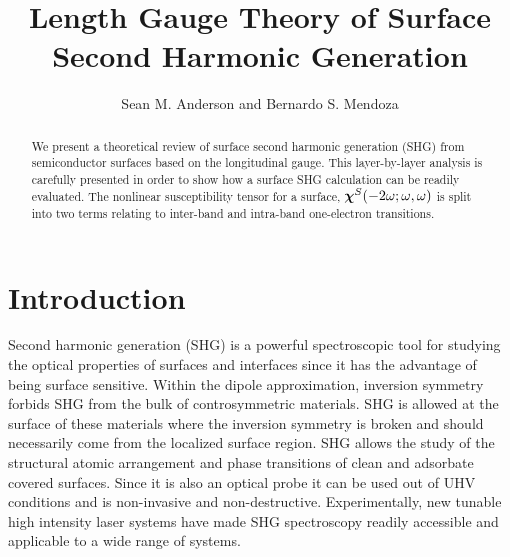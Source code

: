 \documentclass[floatfix,prb,aps,superscriptaddress,11pt,preprint,letterpaper]{revtex4}
\begin{document}
\title{Length Gauge Theory of Surface Second Harmonic Generation}
\author{Sean M. Anderson and Bernardo S. Mendoza}

\begin{abstract}
We present a theoretical review of surface second harmonic generation (SHG) 
from semiconductor surfaces based on the longitudinal gauge. This 
layer-by-layer analysis is carefully presented in order to show how a 
surface SHG calculation can be readily evaluated. The nonlinear susceptibility 
tensor for a surface, $\boldsymbol{\chi}^S(-2\omega;\omega,\omega)$
 is split into two terms relating to inter-band 
and intra-band one-electron transitions. 


\end{abstract}  

\maketitle
\tableofcontents

\section{Introduction}\label{intro}

Second harmonic generation (SHG) is a powerful spectroscopic tool for 
studying the optical properties of surfaces and interfaces since it has 
the advantage of being surface sensitive. Within the dipole approximation, 
inversion symmetry forbids SHG from the bulk of controsymmetric materials. 
SHG is allowed at the surface of these materials where the inversion symmetry 
is broken and should necessarily come from the localized surface region. 
SHG allows the study of the structural atomic arrangement and phase 
transitions of clean and adsorbate covered surfaces. Since it is also an 
optical probe it can be used out of UHV conditions and is non-invasive 
and non-destructive. Experimentally, new tunable high intensity laser systems 
have made SHG spectroscopy readily accessible and applicable to a wide range 
of systems.\cite{downer_optical_2001,lupke_characterization_1999}
\end{document}

